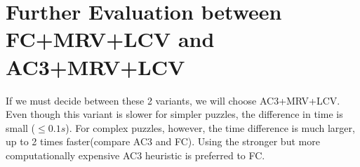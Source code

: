\documentclass[runningheads]{llncs}
\begin{document}
\section{Further Evaluation between FC+MRV+LCV and AC3+MRV+LCV}
If we must decide between these 2 variants, we will choose AC3+MRV+LCV. Even though this variant is slower for simpler puzzles, the difference in time is small ($\leq 0.1s$). For complex puzzles, however, the time difference is much larger, up to 2 times faster(compare AC3 and FC). Using the stronger but more computationally expensive AC3 heuristic is preferred to FC.
\end{document}
